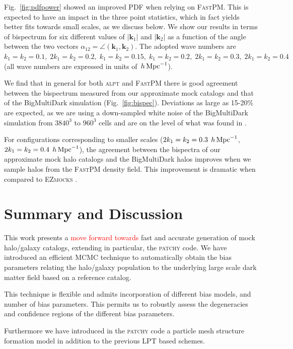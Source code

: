 \documentclass[english,usenatbib]{mn2e}
\newcommand{\tod}[1]{{\textcolor{red}{ #1}}}
\newcommand{\hperm}{\,h\,{\rm Mpc}^{-1}}
\begin{document}
Fig.~\ref{fig:pdfpower} showed an improved PDF when relying on \textsc{FastPM}. This is expected to have an impact in the three point statistics, which in fact yields better fits towards small scales, as we discuss below. 
We show our results in terms of bispectrum for six different values of $|\mathbf{k}_1|$ and $|\mathbf{k}_2|$ as a function of the angle between the two vectors $\alpha_{12} = \angle (\mathbf{k}_1 , \mathbf{k}_2)$. The adopted wave numbers are $k_1=k_2=0.1,\; 2k_1=k_2=0.2,\; k_1=k_2=0.15,\; k_1=k_2=0.2,\; 2k_1=k_2=0.3,\; 2k_1=k_2=0.4$ (all wave numbers are expressed in units of $\hperm$). 

We find that in general for both \textsc{alpt} and \textsc{FastPM} there is good agreement between the bispectrum measured from our approximate mock catalogs and that of the BigMultiDark simulation (Fig.~\ref{fig:bispec}). 
Deviations as large as 15-20\% are expected, as we are using a down-sampled  white noise of the BigMultiDark simulation from $3840^3$ to $960^3$ cells and are on the level of what was found in \citet[][]{kitaura2015}. 

For configurations corresponding to smaller scales ($2k_1=k_2=0.3\;\hperm$, $2k_1=k_2=0.4\;\hperm$), the agreement between the bispectra of our approximate mock halo catalogs and the BigMultiDark halos improves when we sample halos from the \textsc{FastPM} density field. This improvement is dramatic when compared to \textsc{EZmocks} \citep[see real-space lines in the lower panels in Fig.~5 of][]{eazymock}.


\section{Summary and Discussion}
\label{sec:discussion}


This work presents a \tod{move forward towards} fast and accurate generation of mock halo/galaxy catalogs, extending in particular, the \textsc{patchy} code. We have introduced an efficient MCMC technique to automatically obtain the bias parameters relating the halo/galaxy population to the underlying large scale dark matter field based on a reference catalog. 

This technique is flexible and admits incorporation of different bias models, and number of bias parameters. This permits us to robustly assess the degeneracies and confidence regions of the different bias parameters.

Furthermore we have introduced in the \textsc{patchy} code a particle mesh structure formation model \citep[the \textsc{FastPM} code, see][]{fastpm} in addition to the previous LPT based schemes.
\end{document}
